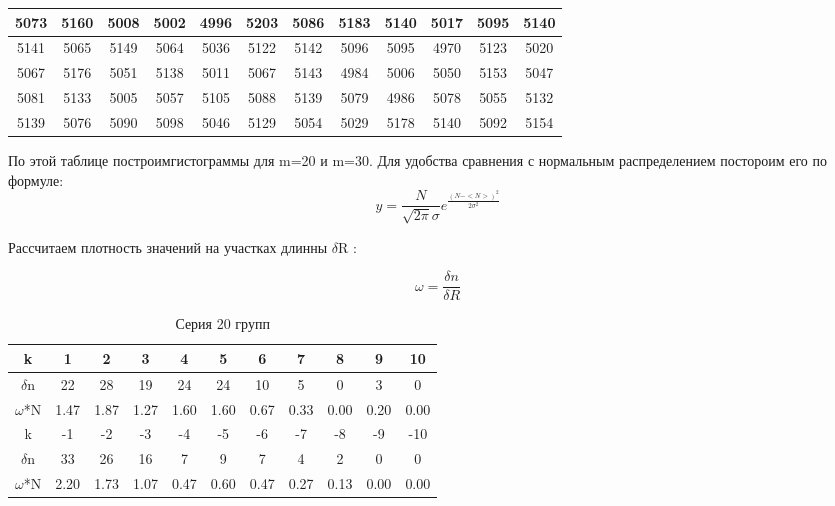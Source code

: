 \documentclass{article}
\begin{document}
\begin{table}[h!]
\begin{center}
\begin{tabular}{||c|c|c|c|c|c|c|c|c|c|c|c||}
\hline 
5073 & 5160 & 5008 & 5002 & 4996 & 5203 & 5086 & 5183 & 5140 & 5017 & 5095 & 5140 \\
\hline 
5141 & 5065 & 5149 & 5064 & 5036 & 5122 & 5142 & 5096 & 5095 & 4970 & 5123 & 5020 \\
\hline 
5067 & 5176 & 5051 & 5138 & 5011 & 5067 & 5143 & 4984 & 5006 & 5050 & 5153 & 5047 \\
\hline 
5081 & 5133 & 5005 & 5057 & 5105 & 5088 & 5139 & 5079 & 4986 & 5078 & 5055 & 5132 \\
\hline
5139 & 5076 & 5090 & 5098 & 5046 & 5129 & 5054 & 5029 & 5178 & 5140 & 5092 & 5154 \\
\hline
\end{tabular}
\end{center}
\end{table}





По этой таблице построимгистограммы для m=20 и m=30. Для удобства сравнения с нормальным распределением постороим его по формуле:
\begin{equation*}
y = \frac{N}{\sqrt{2\pi}\sigma}e^{\frac{(N-<N>)^2}{2\sigma^2}}
\end{equation*}

Рассчитаем плотность значений на участках длинны $\delta$R :

\begin{equation*}
\omega = \frac{\delta n}{\delta R} 
\end{equation*}


\begin{table}
\begin{right}
\caption{Серия 20 групп}
\end{right}
\begin{center}
\begin{tabular}{|c||c|c|c|c|c|c|c|c|c|c|}
\hline
k & 1 & 2 & 3 & 4 & 5 & 6 & 7 & 8 & 9 & 10 \\
\hline
$\delta$n & 22 & 28 & 19 & 24 & 24 & 10 & 5 & 0 & 3 & 0 \\
\hline
$\omega$*N & 1.47 & 1.87 & 1.27& 1.60 & 1.60 & 0.67 & 0.33 & 0.00 & 0.20 & 0.00 \\
\hline
\hline
k & -1&-2&-3&-4&-5&-6&-7&-8&-9&-10 \\
\hline
$\delta$n &33& 26& 16& 7& 9& 7& 4& 2& 0& 0\\
\hline
$\omega$*N & 2.20& 1.73& 1.07& 0.47& 0.60& 0.47& 0.27& 0.13& 0.00& 0.00 \\
\hline
\end{tabular}
\end{center}
\end{table}
\end{document}
